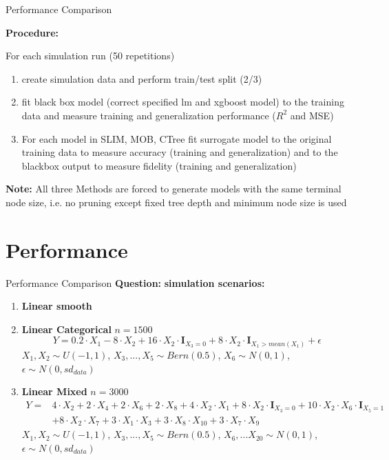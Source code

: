 \documentclass[9pt, xcolor=table]{beamer}
\begin{document}
\begin{frame}{Performance Comparison}


\textbf{Procedure:} 

For each simulation run (50 repetitions)
\begin{enumerate}
    \item create simulation data and perform train/test split (2/3)
    \item fit black box model (correct specified lm and xgboost model) to the training data and measure training and generalization performance ($R^2$ and MSE)
    \item For each model in SLIM, MOB, CTree fit surrogate model to the original training data to measure accuracy (training and generalization) and to the blackbox output to measure fidelity (training and generalization)
\end{enumerate}

\textbf{Note:} All three Methods are forced to generate models with the same terminal node size, i.e. no pruning except fixed tree depth and minimum node size is used

\end{frame}

\section{Performance}
\begin{frame}{Performance Comparison}
\textbf{Question:} 
\textbf{simulation scenarios:}
\begin{enumerate}
    \item \textbf{Linear smooth} 
    
    \item \textbf{Linear Categorical} $n= 1500$ $$ Y =  0.2\cdot X_{1} - 8\cdot X_2 + 16\cdot X_2\cdot \mathbf{I}_{X_3 = 0} + 8\cdot X_2\cdot \mathbf{I}_{X_1 > mean(X_1)} + \epsilon $$
    $X_1, X_2 \sim U(-1,1)$, $X_3, ..., X_5 \sim Bern(0.5)$, $X_6 \sim N(0,1)$,  $\epsilon \sim N(0, sd_{data})$
    
    \item \textbf{Linear Mixed}  $n= 3000$
    \begin{align*}
    Y = & 4 \cdot X_2 + 2 \cdot X_4 + 2 \cdot X_6 + 2 \cdot X_8 + 4 \cdot X_2 \cdot X_1 + 8 \cdot X_2 \cdot \mathbf{I}_{X_3 = 0} + 10 \cdot X_2 \cdot X_6  \cdot \mathbf{I}_{X_5 = 1} \\
    & + 8 \cdot X_2 \cdot X_7 + 3 \cdot X_1 \cdot X_3 + 3 \cdot X_8 \cdot X_10 + 3 \cdot X_7 \cdot X_9     
    \end{align*}
    $X_1, X_2 \sim U(-1,1)$, $X_3, ..., X_5 \sim Bern(0.5)$, $X_6, ... X_20 \sim N(0,1)$,  $\epsilon \sim N(0, sd_{data})$
\end{enumerate}
    
\end{frame}
\end{document}
